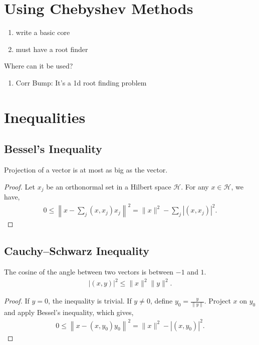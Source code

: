 \documentclass{amsart}
\theoremstyle{plain}
\numberwithin{equation}{section}
\begin{document}
\section{Using Chebyshev Methods}
\begin{enumerate}
\item write a basic core
\item must have a root finder
\end{enumerate}

Where can it be used?
\begin{enumerate}
\item Corr Bump: It's a 1d root finding problem
\end{enumerate}

\section*{Inequalities}
\subsection*{Bessel's Inequality}
Projection of a vector is at most as big 
as the vector. 
\begin{proof}
Let ${x_j}$ be an orthonormal set in a Hilbert space $\mathcal{H}$.
For any $x \in \mathcal{H}$, we have, 
\begin{align*}
0 \leq \left\|x - \sum_{j}(x, x_j) x_j\right\|^2 = 
\|x\|^2 - \sum_{j}|(x, x_j)|^2.
\end{align*}
\end{proof}

\subsection*{Cauchy--Schwarz Inequality}
The cosine of the angle between two vectors is 
between $-1$ and $1$. 
\begin{align*}
|(x, y)|^2 \leq \|x\|^2 \|y\|^2.
\end{align*}

\begin{proof}
If $y=0$, the inequality is trivial. If $y\neq 0$, define
$y_0 = \frac{y}{\|y\|}$. Project $x$ on $y_0$ and apply
Bessel's inequality, which gives,
\begin{align*}
0 \leq \left\|x - (x, y_0) y_0\right\|^2 = 
\|x\|^2 - |(x, y_0)|^2.
\end{align*}
\end{proof}
\end{document}
